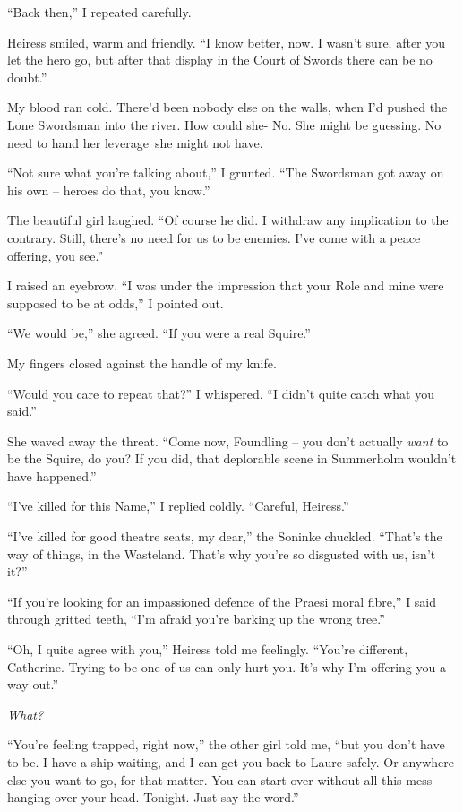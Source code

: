 \documentclass[12pt, openany]{book}
\begin{document}
“Back then,” I repeated carefully.

Heiress smiled, warm and friendly. “I know better, now. I wasn’t sure, after you let the hero go, but after that display in the Court of Swords there can be no doubt.”

My blood ran cold. There’d been nobody else on the walls, when I’d pushed the Lone Swordsman into the river. How could she- No. She might be guessing. No need to hand her leverage she might not have.

“Not sure what you’re talking about,” I grunted. “The Swordsman got away on his own – heroes do that, you know.”

The beautiful girl laughed. “Of course he did. I withdraw any implication to the contrary. Still, there’s no need for us to be enemies. I’ve come with a peace offering, you see.”

I raised an eyebrow. “I was under the impression that your Role and mine were supposed to be at odds,” I pointed out.

“We would be,” she agreed. “If you were a real Squire.”

My fingers closed against the handle of my knife.

“Would you care to repeat that?” I whispered. “I didn’t quite catch what you said.”

She waved away the threat. “Come now, Foundling – you don’t actually \textit{want} to be the Squire, do you? If you did, that deplorable scene in Summerholm wouldn’t have happened.”

“I’ve killed for this Name,” I replied coldly. “Careful, Heiress.”

“I’ve killed for good theatre seats, my dear,” the Soninke chuckled. “That’s the way of things, in the Wasteland. That’s why you’re so disgusted with us, isn’t it?”

“If you’re looking for an impassioned defence of the Praesi moral fibre,” I said through gritted teeth, “I’m afraid you’re barking up the wrong tree.”

“Oh, I quite agree with you,” Heiress told me feelingly. “You’re different, Catherine. Trying to be one of us can only hurt you. It’s why I’m offering you a way out.”

\textit{What?}

“You’re feeling trapped, right now,” the other girl told me, “but you don’t have to be. I have a ship waiting, and I can get you back to Laure safely. Or anywhere else you want to go, for that matter. You can start over without all this mess hanging over your head. Tonight. Just say the word.”
\end{document}
